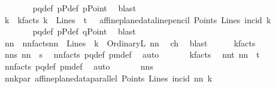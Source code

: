 \begin{isabellebody}
\ \ \ \ \ \ \isamarkupfalse%
\ pq{\isacharunderscore}{\kern0pt}def\ pPdef\ pPoint\ \isamarkupfalse%
\ blast\ \isanewline
\ \ \ \ \isamarkupfalse%
\ k{}\ \ k{}{\isacharunderscore}{\kern0pt}facts{\isacharcolon}{\kern0pt}\ {\isachardoublequoteopen}k{}\ {\isasymin}\ Lines\ {\isasymand}\ t\ {\isacharequal}{\kern0pt}\ \ affine{\isacharunderscore}{\kern0pt}plane{\isacharunderscore}{\kern0pt}data{\isachardot}{\kern0pt}line{\isacharunderscore}{\kern0pt}pencil\ Points\ Lines\ {\isacharparenleft}{\kern0pt}incid{\isacharparenright}{\kern0pt}\ k{}{\isachardoublequoteclose}\ \isanewline
\ \ \ \ \ \ \isamarkupfalse%
\ pq{\isacharunderscore}{\kern0pt}def\ pPdef\ qPoint\ \isamarkupfalse%
\ blast\ \isanewline
\ \ \ \ \isamarkupfalse%
\ nn\ \ nn{\isacharunderscore}{\kern0pt}facts{\isacharcolon}{\kern0pt}{\isachardoublequoteopen}nn\ {\isasymin}\ Lines\ {\isasymand}\ k\ {\isacharequal}{\kern0pt}\ OrdinaryL\ nn{\isachardoublequoteclose}\ \isamarkupfalse%
\ ch{}\ \isamarkupfalse%
\ blast\isanewline
\ \ \ \ \isamarkupfalse%
\ k{\isacharunderscore}{\kern0pt}facts\ \isamarkupfalse%
\ nns{\isacharcolon}{\kern0pt}\ {\isachardoublequoteopen}nn\ {\isasymin}\ s{\isachardoublequoteclose}\ \isamarkupfalse%
\ nn{\isacharunderscore}{\kern0pt}facts\ pq{\isacharunderscore}{\kern0pt}def\ pm{\isacharunderscore}{\kern0pt}def\ \isamarkupfalse%
\ auto\ \isanewline
\ \ \ \ \isamarkupfalse%
\ k{\isacharunderscore}{\kern0pt}facts\ \isamarkupfalse%
\ nnt{\isacharcolon}{\kern0pt}\ {\isachardoublequoteopen}nn\ {\isasymin}\ t{\isachardoublequoteclose}\ \isamarkupfalse%
\ nn{\isacharunderscore}{\kern0pt}facts\ pq{\isacharunderscore}{\kern0pt}def\ pm{\isacharunderscore}{\kern0pt}def\ \isamarkupfalse%
\ auto\ \isanewline
\ \ \ \ \isamarkupfalse%
\ nns\ \isamarkupfalse%
\ nn{\isacharunderscore}{\kern0pt}k{}{\isacharunderscore}{\kern0pt}par{\isacharcolon}{\kern0pt}\ {\isachardoublequoteopen}affine{\isacharunderscore}{\kern0pt}plane{\isacharunderscore}{\kern0pt}data{\isachardot}{\kern0pt}parallel\ Points\ Lines\ {\isacharparenleft}{\kern0pt}incid{\isacharparenright}{\kern0pt}\ nn\ k{}{\isachardoublequoteclose}\ \isamarkupfalse%

\end{isabellebody}
